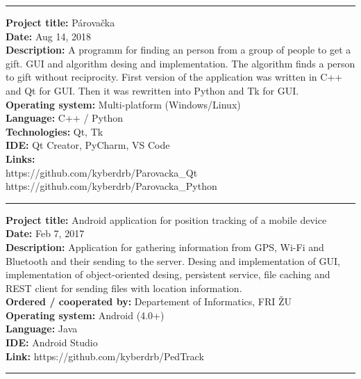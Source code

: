 \documentclass[slovak]{article}
\begin{document}
\begin{center}\rule{3in}{0.4pt}\end{center}

\noindent
\textbf{Project title:} Párovačka\\
\textbf{Date:} Aug 14, 2018\\
\textbf{Description:} A programm for finding an person from a
group of people to get a gift. GUI and algorithm desing and
implementation. The algorithm finds a person to gift without
reciprocity. First version of the application was written in C++ and Qt
for GUI. Then it was rewritten into Python and Tk for
GUI.\\
\textbf{Operating system:} Multi-platform (Windows/Linux)\\
\textbf{Language:} C++ / Python\\
\textbf{Technologies:} Qt, Tk\\
\textbf{IDE:} Qt Creator, PyCharm, VS
Code\\
\textbf{Links:}\\
https://github.com/kyberdrb/Parovacka\_Qt\\
https://github.com/kyberdrb/Parovacka\_Python

\begin{center}\rule{3in}{0.4pt}\end{center}

\noindent
\textbf{Project title:} Android application for position tracking of a mobile device\\
\textbf{Date:} Feb 7, 2017\\
\textbf{Description:} Application for gathering information from GPS, Wi-Fi and Bluetooth and
their sending to the server. Desing and implementation of GUI,
implementation of object-oriented desing, persistent service, file
caching and REST client for sending files with location
information.\\
\textbf{Ordered / cooperated by:} Departement of Informatics, FRI ŽU\\
\textbf{Operating system:} Android (4.0+)\\
\textbf{Language:} Java\\
\textbf{IDE:} Android Studio\\
\textbf{Link:} https://github.com/kyberdrb/PedTrack

\begin{center}\rule{3in}{0.4pt}\end{center}
\end{document}
